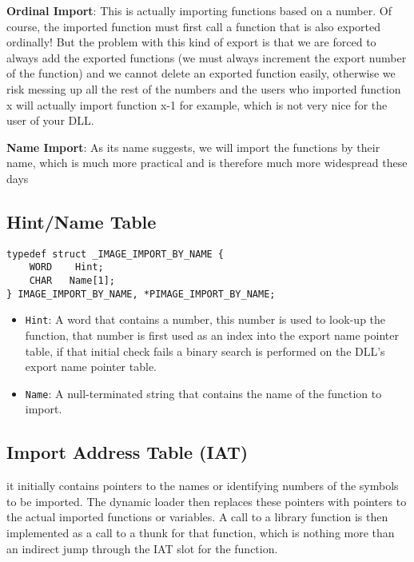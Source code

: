 {\bf Ordinal Import}:
This is actually importing functions based on a number. Of course, the imported function must first call a function that is also exported ordinally! But the problem with this kind of export is that we are forced to always add the exported functions (we must always increment the export number of the function) and we cannot delete an exported function easily, otherwise we risk messing up all the rest of the numbers and the users who imported function x will actually import function x-1 for example, which is not very nice for the user of your DLL.

{\bf Name Import}:
As its name suggests, we will import the functions by their name, which is much more practical and is therefore much more widespread these days

\subsection{Hint/Name Table}

\begin{verbatim}
typedef struct _IMAGE_IMPORT_BY_NAME {
    WORD    Hint;
    CHAR   Name[1];
} IMAGE_IMPORT_BY_NAME, *PIMAGE_IMPORT_BY_NAME;    
\end{verbatim}

\begin{itemize}
    \item \verb+Hint+: A word that contains a number, this number is used to look-up the function, that number is first used as an index into the export name pointer table, if that initial check fails a binary search is performed on the DLL’s export name pointer table.
    \item \verb+Name+: A null-terminated string that contains the name of the function to import.
\end{itemize}



\subsection{Import Address Table (IAT)}

it initially contains pointers to the names or
identifying numbers of the symbols to be imported. The dynamic loader then
replaces these pointers with pointers to the actual imported functions or
variables. A call to a library function is then implemented as a call to a thunk for
that function, which is nothing more than an indirect jump through the IAT slot
for the function.
